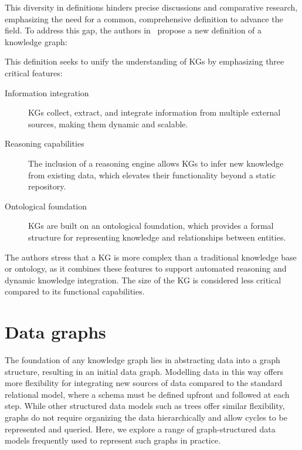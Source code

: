 This diversity in definitions hinders precise discussions and comparative research, emphasizing the need for a common, comprehensive definition to advance the field. To address this gap, the authors in~\cite{Ehrlinger2016TowardsAD} propose a new definition of a knowledge graph: 
\begin{center}
    \begin{quote}
    \end{quote}
\end{center}
This definition seeks to unify the understanding of KGs by emphasizing three critical features:
\begin{description}
    \item[Information integration] KGs collect, extract, and integrate information from multiple external sources, making them dynamic and scalable.
    \item[Reasoning capabilities] The inclusion of a reasoning engine allows KGs to infer new knowledge from existing data, which elevates their functionality beyond a static repository.
    \item[Ontological foundation] KGs are built on an ontological foundation, which provides a formal structure for representing knowledge and relationships between entities. 
\end{description}

The authors stress that a KG is more complex than a traditional knowledge base or ontology, as it combines these features to support automated reasoning and dynamic knowledge integration. The size of the KG is considered less critical compared to its functional capabilities.

\section{Data graphs}
The foundation of any knowledge graph lies in abstracting data into a graph structure, resulting in an initial data graph. Modelling data in this way offers more flexibility for integrating new sources of data compared to the standard relational model, where a schema must be defined upfront and followed at each step. While other structured data models such as trees offer similar flexibility, graphs do not require organizing the data hierarchically and allow cycles to be represented and queried. Here, we explore a range of graph-structured data models frequently used to represent such graphs in practice.~\cite{Hogan2021KGs}

